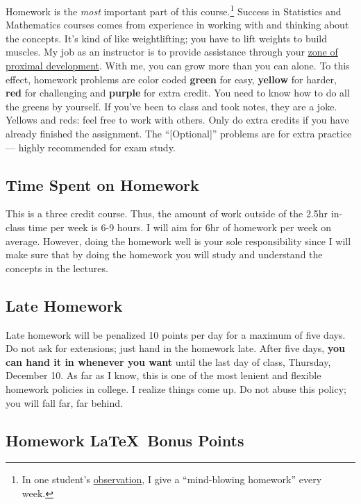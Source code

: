 \documentclass[12pt]{article}
\newcommand{\ingreen}[1]{\color{green}\textbf{#1} \color{black}}
\newcommand{\inyellow}[1]{\color{yellow}\textbf{#1} \color{black}}
\newcommand{\inred}[1]{\color{red}\textbf{#1} \color{black}}
\newcommand{\inpurple}[1]{\color{purple}\textbf{#1} \color{black}}
\newcommand{\qu}[1]{``#1''}
\begin{document}
Homework is the \textit{most} important part of this course.\footnote{In one student's \href{http://www.ratemyprofessors.com/ShowRatings.jsp?tid=1951051}{observation}, I give a \qu{mind-blowing homework} every week.} Success in Statistics and Mathematics courses comes from experience in working with and thinking about the concepts. It's kind of like weightlifting; you have to lift weights to build muscles. My job as an instructor is to provide assistance through your \href{http://en.wikipedia.org/wiki/Zone_of_proximal_development}{zone of proximal development}. With me, you can grow more than you can alone. To this effect, homework problems are color coded \ingreen{green} for easy, \inyellow{yellow} for harder, \inred{red} for challenging and \inpurple{purple} for extra credit. You need to know how to do all the greens by yourself. If you've been to class and took notes, they are a joke. Yellows and reds: feel free to work with others. Only do extra credits if you have already finished the assignment. The \qu{[Optional]} problems are for extra practice --- highly recommended for exam study.

\subsection*{Time Spent on Homework }

This is a three credit course. Thus, the amount of work outside of the 2.5hr in-class time per week is 6-9 hours. I will aim for 6hr of homework per week on average. However, doing the homework well is your sole responsibility since I will make sure that by doing the homework you will study and understand the concepts in the lectures.

\subsection*{Late Homework}

Late homework will be penalized 10 points per day for a maximum of five days. Do not ask for extensions; just hand in the homework late. After five days, \textbf{you can hand it in whenever you want} until the last day of class, Thursday, December 10. As far as I know, this is one of the most lenient and flexible homework policies in college. I realize things come up. Do not abuse this policy; you will fall far, far behind.

\subsection*{Homework \LaTeX~Bonus Points}
\end{document}
